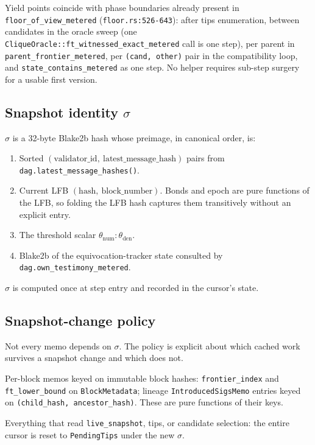 \documentclass[11pt]{article}
\newcommand{\sigid}{\ensuremath{\sigma}}
\newcommand{\code}[1]{\texttt{#1}}
\begin{document}
Yield points coincide with phase boundaries already present in
\code{floor\_of\_view\_metered} (\code{floor.rs:526-643}): after tips
enumeration, between candidates in the oracle sweep (one
\code{CliqueOracle::ft\_witnessed\_exact\_metered} call is one step),
per parent in \code{parent\_frontier\_metered}, per \code{(cand, other)}
pair in the compatibility loop, and \code{state\_contains\_metered} as
one step. No helper requires sub-step surgery for a usable first
version.

\subsection{Snapshot identity $\sigid$}
\label{sec:sigma}

$\sigid$ is a 32-byte Blake2b hash whose preimage, in canonical order,
is:
\begin{enumerate}[label=\arabic*.]
\item Sorted $(\text{validator\_id},\ \text{latest\_message\_hash})$
pairs from \code{dag.latest\_message\_hashes()}.
\item Current LFB $(\text{hash},\ \text{block\_number})$. Bonds and
epoch are pure functions of the LFB, so folding the LFB hash captures
them transitively without an explicit entry.
\item The threshold scalar $\theta_{\text{num}}{:}\theta_{\text{den}}$.
\item Blake2b of the equivocation-tracker state consulted by
\code{dag.own\_testimony\_metered}.
\end{enumerate}
$\sigid$ is computed once at step entry and recorded in the cursor's
state.

\subsection{Snapshot-change policy}

Not every memo depends on $\sigid$. The policy is explicit about which
cached work survives a snapshot change and which does not.

\begin{description}[style=nextline]
\item[Survives $\sigid$ change] Per-block memos keyed on immutable
block hashes: \code{frontier\_index} and \code{ft\_lower\_bound} on
\code{BlockMetadata}; lineage \code{IntroducedSigsMemo} entries keyed
on \code{(child\_hash, ancestor\_hash)}. These are pure functions of
their keys.
\item[Discarded on $\sigid$ change] Everything that read
\code{live\_snapshot}, tips, or candidate selection: the entire cursor
is reset to \code{PendingTips} under the new $\sigid$.
\end{description}
\end{document}
